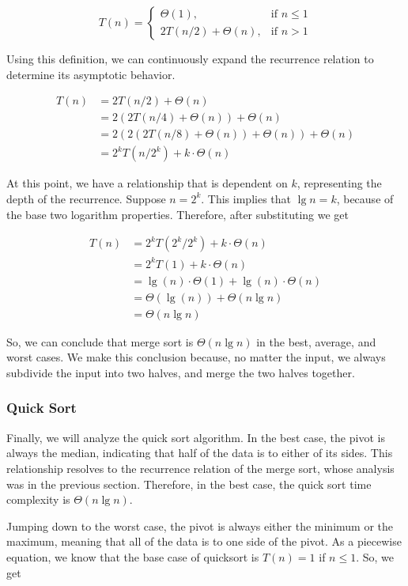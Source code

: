 \[
T(n)=
  \begin{cases}
    \Theta(1), & \text{if } n \leq 1\\
    2T(n/2) + \Theta(n), & \text{if } n > 1
  \end{cases}
\]

Using this definition, we can continuously expand the recurrence relation to determine its asymptotic behavior.

\begin{align*}
  T(n) &= 2T(n/2) + \Theta(n)\\
       &= 2(2T(n/4) + \Theta(n)) + \Theta(n)\\
       &= 2(2(2T(n/8) + \Theta(n)) + \Theta(n)) + \Theta(n)\\
       &= 2^kT(n/2^k) + k\cdot\Theta(n)
\end{align*}

At this point, we have a relationship that is dependent on $k$, representing the depth of the recurrence. Suppose $n=2^k$. This implies that $\lg{n} = k$, because of the base two logarithm properties. Therefore, after substituting we get

\begin{align*}
  T(n) &= 2^kT(2^k/2^k) + k\cdot\Theta(n)\\
       &= 2^kT(1) + k\cdot\Theta(n)\\
       &= \lg(n)\cdot\Theta(1) + \lg(n)\cdot \Theta(n)\\
       &= \Theta{(\lg(n))} + \Theta{(n \lg n)}\\
       &= \Theta{(n \lg n)} 
\end{align*}

So, we can conclude that merge sort is $\Theta(n\lg{n})$ in the best, average, and worst cases. We make this conclusion because, no matter the input, we always subdivide the input into two halves, and merge the two halves together.

\subsubsection*{Quick Sort}
Finally, we will analyze the quick sort algorithm. In the best case, the pivot is always the median, indicating that half of the data is to either of its sides. This relationship resolves to the recurrence relation of the merge sort, whose analysis was in the previous section. Therefore, in the best case, the quick sort time complexity is $\Theta(n \lg n)$. 

Jumping down to the worst case, the pivot is always either the minimum or the maximum, meaning that all of the data is to one side of the pivot. As a piecewise equation, we know that the base case of quicksort is $T(n) = 1$ if $n \leq 1$. So, we get

